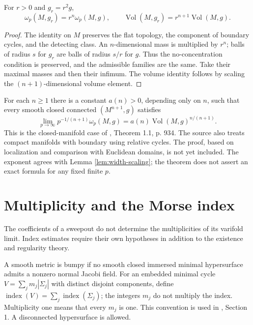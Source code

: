 \begin{lemma}\label{lem:width-scaling}
For $r>0$ and $g_r=r^2g$,
\[
 \omega_p(M,g_r)=r^n\omega_p(M,g),\qquad
 \operatorname{Vol}(M,g_r)=r^{n+1}\operatorname{Vol}(M,g).
\]
\end{lemma}
\begin{proof}
The identity on $M$ preserves the flat topology, the component of boundary cycles, and the detecting class. An $n$-dimensional mass is multiplied by $r^n$; balls of radius $s$ for $g_r$ are balls of radius $s/r$ for $g$. Thus the no-concentration condition is preserved, and the admissible families are the same. Take their maximal masses and then their infimum. The volume identity follows by scaling the $(n+1)$-dimensional volume element.
\end{proof}

\begin{theorem}\label{thm:weyl-volume}
For each $n\geq1$ there is a constant $a(n)>0$, depending only on $n$, such that every smooth closed connected $(M^{n+1},g)$ satisfies
\[
 \lim_{p\to\infty}p^{-1/(n+1)}\omega_p(M,g)
 =a(n)\operatorname{Vol}(M,g)^{n/(n+1)}.
\]
This is the closed-manifold case of \cite{LMN}, Theorem 1.1, p. 934. The source also treats compact manifolds with boundary using relative cycles. The proof, based on localization and comparison with Euclidean domains, is not yet included. The exponent agrees with Lemma \ref{lem:width-scaling}; the theorem does not assert an exact formula for any fixed finite $p$.
\end{theorem}

\chapter{Multiplicity and the Morse index}\label{sec:minmax-index}
The coefficients of a sweepout do not determine the multiplicities of its varifold limit. Index estimates require their own hypotheses in addition to the existence and regularity theory.

\begin{definition}\label{def:bumpy-minimal-cycle}
A smooth metric is bumpy if no smooth closed immersed minimal hypersurface admits a nonzero normal Jacobi field. For an embedded minimal cycle
$V=\sum_j m_j|\Sigma_j|$ with distinct disjoint components, define
$\operatorname{index}(V)=\sum_j\operatorname{index}(\Sigma_j)$;
the integers $m_j$ do not multiply the index. Multiplicity one means that every $m_j$ is one. This convention is used in \cite{MNIndex}, Section 1. A disconnected hypersurface is allowed.
\end{definition}


